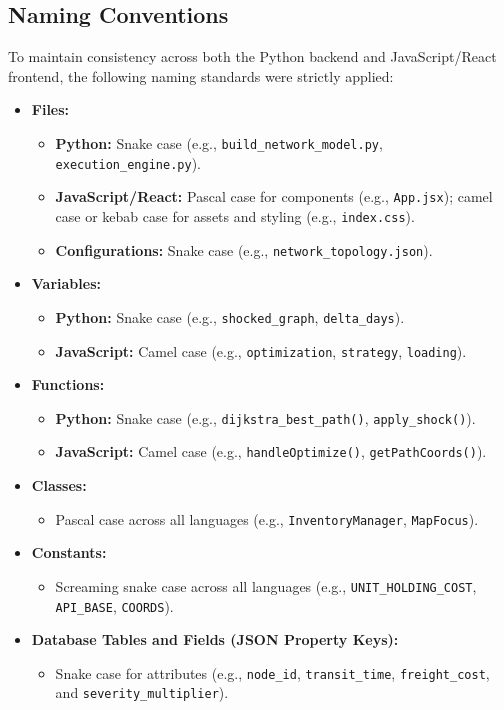 \subsection[Naming Conventions]{Naming Conventions}
To maintain consistency across both the Python backend and JavaScript/React frontend, the following naming standards were strictly applied:

\begin{itemize}
    \item \textbf{Files:}
    \begin{itemize}
        \item \textbf{Python:} Snake case (e.g., \texttt{build\_network\_model.py}, \texttt{execution\_engine.py}).
        \item \textbf{JavaScript/React:} Pascal case for components (e.g., \texttt{App.jsx}); camel case or kebab case for assets and styling (e.g., \texttt{index.css}).
        \item \textbf{Configurations:} Snake case (e.g., \texttt{network\_topology.json}).
    \end{itemize}
    \item \textbf{Variables:}
    \begin{itemize}
        \item \textbf{Python:} Snake case (e.g., \texttt{shocked\_graph}, \texttt{delta\_days}).
        \item \textbf{JavaScript:} Camel case (e.g., \texttt{optimization}, \texttt{strategy}, \texttt{loading}).
    \end{itemize}
    \item \textbf{Functions:}
    \begin{itemize}
        \item \textbf{Python:} Snake case (e.g., \texttt{dijkstra\_best\_path()}, \texttt{apply\_shock()}).
        \item \textbf{JavaScript:} Camel case (e.g., \texttt{handleOptimize()}, \texttt{getPathCoords()}).
    \end{itemize}
    \item \textbf{Classes:}
    \begin{itemize}
        \item Pascal case across all languages (e.g., \texttt{InventoryManager}, \texttt{MapFocus}).
    \end{itemize}
    \item \textbf{Constants:}
    \begin{itemize}
        \item Screaming snake case across all languages (e.g., \texttt{UNIT\_HOLDING\_COST}, \texttt{API\_BASE}, \texttt{COORDS}).
    \end{itemize}
    \item \textbf{Database Tables and Fields (JSON Property Keys):}
    \begin{itemize}
        \item Snake case for attributes (e.g., \texttt{node\_id}, \texttt{transit\_time}, \texttt{freight\_cost}, and \texttt{severity\_multiplier}).
    \end{itemize}
\end{itemize}

